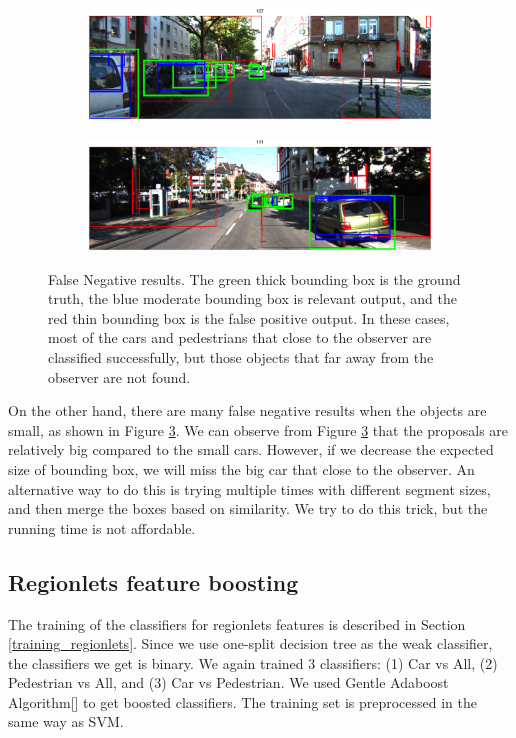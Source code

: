 \documentclass{article} %
\begin{document}
\begin{figure}[htb]
\begin{subfigure}[b]{0.5\textwidth}
    \includegraphics[width=.9\textwidth]{test-fn3.eps}
    \label{fig:test-fn3}
\end{subfigure}
\begin{subfigure}[b]{0.5\textwidth}
    \includegraphics[width=.9\textwidth]{test-fn4.eps}
    \label{fig:test-fn4}
\end{subfigure}
\caption{False Negative results. The green thick bounding box is the ground truth, the blue moderate bounding box is relevant output, and the red thin bounding box is the false positive output. In these cases, most of the cars and pedestrians that close to the observer are classified successfully, but those objects that far away from the observer are not found.
\label{fig:test-fn}}
\end{figure}

On the other hand, there are many false negative results when the objects are small, as shown in Figure \ref{fig:test-fn}. We can observe from Figure \ref{fig:test-fn} that the proposals are relatively big compared to the small cars. However, if we decrease the expected size of bounding box, we will miss the big car that close to the observer. An alternative way to do this is trying multiple times with different segment sizes, and then merge the boxes based on similarity. We try to do this trick, but the running time is not affordable. 

\subsection{Regionlets feature boosting}

The training of the classifiers for regionlets features is described in Section \ref{training_regionlets}. Since we use one-split decision tree as the weak classifier, the classifiers we get is binary. We again trained 3 classifiers: (1) Car vs All, (2) Pedestrian vs All, and (3) Car vs Pedestrian. We used Gentle Adaboost Algorithm[] to get boosted classifiers. The training set is preprocessed in the same way as SVM. 
\end{document}
